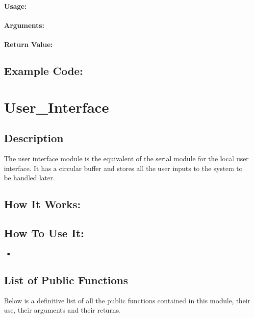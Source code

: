 \documentclass[]{report}
\begin{document}
\subsection{}
\subsubsection{Usage:}

\subsubsection{Arguments:}

\subsubsection{Return Value:}

\section{Example Code:}

\chapter{User\_Interface}
\section{Description}
The user interface module is the equivalent of the serial module for the local user interface. It has a circular buffer and stores all the user inputs to the system to be handled later.

\section{How It Works:}

\section{How To Use It:}
\begin{itemize}
	\item 
\end{itemize}

\section{List of Public Functions}
Below is a definitive list of all the public functions contained in this module, their use, their arguments and their returns.
\end{document}
